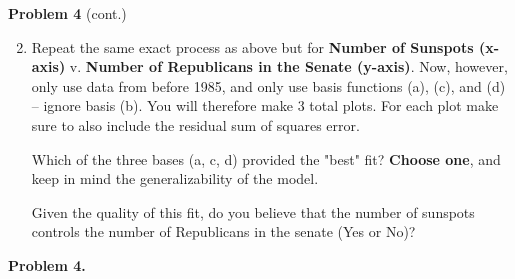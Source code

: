\documentclass[submit]{harvardml}
\begin{document}
\begin{framed}
\noindent\textbf{Problem 4} (cont.)\\
\begin{enumerate}
\setcounter{enumi}{1}
\item Repeat the same exact process as above but for \textbf{Number of Sunspots (x-axis)} v. \textbf{Number of Republicans in the Senate (y-axis)}. 
Now, however, only use data from before 1985, and only use basis functions (a), (c), and (d) -- ignore basis (b). You will therefore make 3 total plots. For each plot make sure to also include the residual sum of squares error.



Which of the three bases (a, c, d) provided the "best" fit? \textbf{Choose one}, and keep in mind the generalizability of the model. 

Given the quality of this fit, do you believe that the number of sunspots controls the number of Republicans in the senate (Yes or No)?
\end{enumerate}
\end{framed}
\newpage
\textbf{Problem 4.}
\end{document}
